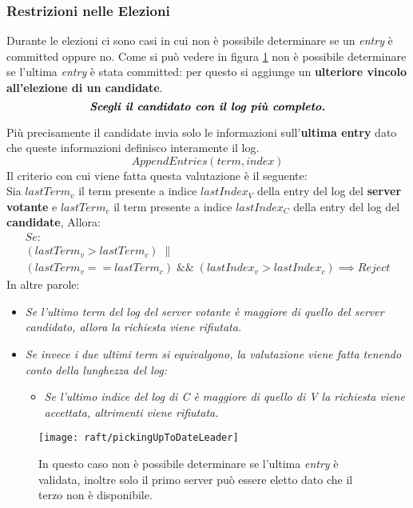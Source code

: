   \subsubsection{Restrizioni nelle Elezioni}
  Durante le elezioni ci sono casi in cui non è possibile determinare se un \textit{entry} è committed oppure no. Come si può vedere in figura \ref{fig:figure10} non è possibile determinare se l'ultima \textit{entry} è stata committed: per questo si aggiunge un \textbf{ulteriore vincolo all'elezione di un candidate}.
  \[
    \emph{\textbf{Scegli il candidato con il log più completo.}}
  \]

  Più precisamente il candidate invia solo le informazioni sull'\textbf{ultima entry} dato che queste informazioni definisco interamente il log.
 \[
      AppendEntries(term, index)
  \]
  Il criterio con cui viene fatta questa valutazione è il seguente:\\
  Sia $lastTerm_v$ il term presente a indice $lastIndex_V$ della entry del log del \textbf{server votante} e $lastTerm_c$ il term presente a indice $lastIndex_C$ della entry del log del \textbf{candidate}, Allora:
  \begin{equation} \label{eq:1}
    \begin{multlined}
    Se:\\
      (lastTerm_v > lastTerm_c) \; \| \;        \\
      (lastTerm_v == lastTerm_c)  \; \&\& \;
      (lastIndex_v > lastIndex_c)
    \implies Reject
    \end{multlined}
  \end{equation}
  In altre parole:
  \begin{itemize}
    \item{\emph{Se l'ultimo term del log del server votante è maggiore di quello del server candidato, allora la  richiesta viene rifiutata. }}
    \item{\emph{Se invece i due ultimi term si equivalgono, la valutazione viene fatta tenendo conto della lunghezza del log:}}
    \begin{itemize}
      \item{\emph{Se l'ultimo indice del log di C è maggiore di quello di V la richiesta viene accettata, altrimenti viene rifiutata.}}
    \end{itemize}
  \end{itemize}
 
  \begin{figure}[H]
  	\centering
  	\texttt{[image: raft/pickingUpToDateLeader]}
  	\captionsetup{singlelinecheck=off}
  	\caption[stateDiagramCaption]{
	 In questo caso non è possibile determinare se l'ultima \textit{entry} è validata, inoltre solo il primo server può essere eletto dato che il terzo non è disponibile.}
  	\label{fig:figure10}
  \end{figure}

